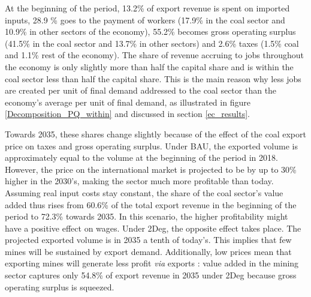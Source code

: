 \documentclass[12pt,english]{article}
\begin{document}
At the beginning of the period, 13.2\% of export revenue is spent on imported inputs, 28.9 \% goes to the payment of workers (17.9\% in the coal sector and 10.9\% in other sectors of the economy), 55.2\% becomes gross operating surplus (41.5\% in the coal sector and 13.7\% in other sectors) and 2.6\% taxes (1.5\% coal and 1.1\% rest of the economy). %
The share of revenue accruing to jobs throughout the economy is only slightly more than half the capital share and is within the coal sector less than half the capital share. This is the main reason why less jobs are created per unit of final demand addressed to the coal sector than the economy's average per unit of final demand, as illustrated in figure \ref{Decomposition_PQ_within} and discussed in section \ref{ec_results}.

Towards 2035, these shares change slightly because of the effect of the coal export price on taxes and gross operating surplus. Under BAU, the exported volume is approximately equal to the volume at the beginning of the period in 2018. However, the price on the international market is projected to be by up to 30\% higher in the 2030's, making the sector much more profitable than today. Assuming real input costs stay constant, the share of the coal sector's value added thus rises from 60.6\% of the total export revenue in the beginning of the period to 72.3\% towards 2035. In this scenario, the higher profitability might have a positive effect on wages. Under 2Deg, the opposite effect takes place. The projected exported volume is in 2035 a tenth of today's. This implies that few mines will be sustained by export demand. Additionally, low prices mean that exporting mines will generate less profit \textit{via} exports : value added in the mining sector captures only 54.8\% of export revenue in 2035 under 2Deg because gross operating surplus is squeezed.%
\end{document}
